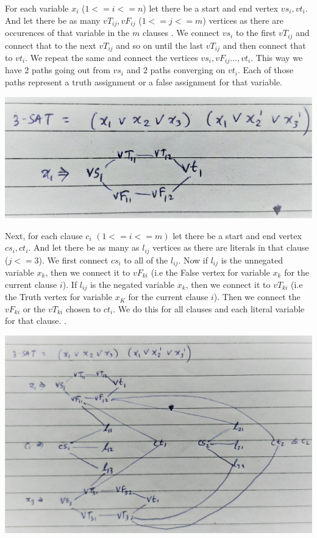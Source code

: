 \documentclass{imports}
\begin{document}
    For each variable $x_i$ ($1<=i<=n$) let there be a start and end vertex $vs_i, vt_i$. And let there be as many $vT_{ij}, vF_{ij}$
    ($1<=j<=m$) vertices as there are occurences of that variable in the $m$ clauses . We connect $vs_i$ to the first $vT_{ij}$ and connect
    that to the next $vT_{ij}$ and so on until the last $vT_{ij}$ and then connect that to $vt_i$. We repeat the same and connect the vertices $vs_i, vF_{ij}..., vt_i$. This way we have 2 paths going out from $vs_i$ and 2 paths converging on $vt_i$. Each of those paths represent a truth assignment
    or a false assignment for that variable. \vspace{10pt}

    \includegraphics[width=\textwidth-25pt]{pic1.jpg} \vspace{10pt}

    Next, for each clause $c_i$ $(1<=i<=m)$ let there be a start and end vertex $cs_i, ct_i$. And let there be as many as $l_{ij}$ vertices as 
    there are literals in that clause ($j<=3$). We first connect $cs_i$ to all of the $l_{ij}$. Now if $l_{ij}$ is the unnegated variable
    $x_k$, then we connect it to $vF_{ki}$ (i.e the False vertex for variable $x_k$ for the current clause $i$). If $l_{ij}$ is the negated
    variable $x_k$, then we connect it to $vT_{ki}$ (i.e the Truth vertex for variable $x_K$ for the current clause $i$). Then we connect 
    the $vF_{ki}$ or the $vT_{ki}$ chosen to $ct_i$. We do this for all clauses and each literal variable for that clause.
    \vspace{10pt}.

    \includegraphics[width=\textwidth-25pt]{pic2.jpg} \vspace{10pt}
\end{document}
